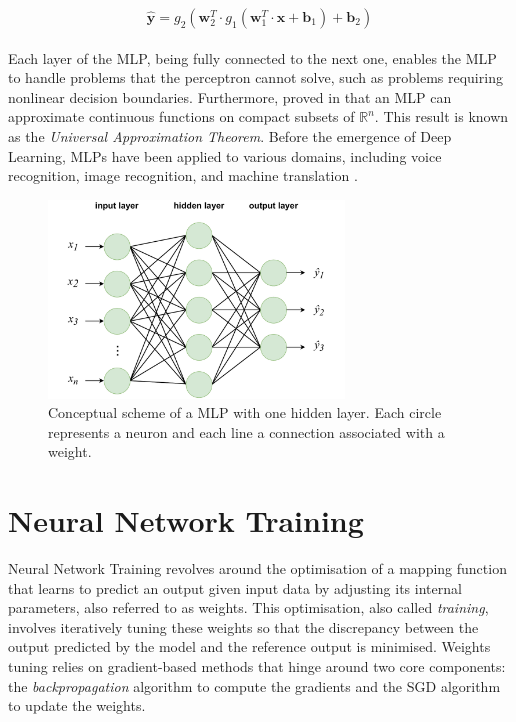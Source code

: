 \begin{equation}
  \label{eqn:dlo:mlp}
  \hat{\mathbf{y}} = g_2(\mathbf{w}_2^T \cdot  g_1(\mathbf{w}_1^T \cdot \mathbf{x} + \mathbf{b}_1) + \mathbf{b}_2)
\end{equation}\\

Each layer of the \ac{MLP}, being fully connected to the next one, enables the
\ac{MLP} to handle problems that the perceptron cannot solve, such as problems
requiring nonlinear decision boundaries. Furthermore,
\citeauthor{cybenko1989approximation} proved in \cite{cybenko1989approximation}
that an \ac{MLP} can approximate continuous functions on compact subsets of
$\mathds{R}^n$. This result is known as the \emph{Universal Approximation
Theorem}. Before the emergence of Deep Learning, \acp{MLP} have been applied to
various domains, including voice recognition, image recognition, and machine
translation \cite{wasserman1988neural}.


\begin{figure}[htbp]
  \centering
  \includegraphics[width=0.7\textwidth]{chapter_dlo/assets/mlp_scheme.pdf}
  \caption{Conceptual scheme of a \ac{MLP} with one hidden layer. Each circle
  represents a neuron and each line a connection associated with a weight.}
  \label{fig:dlo:mlp}
\end{figure}

\section{Neural Network Training}\label{sec:dlo:training}

Neural Network Training revolves around the optimisation of a mapping function
that learns to predict an output given input data by adjusting its internal
parameters, also referred to as weights. This optimisation, also called
\emph{training}, involves iteratively tuning these weights so that the
discrepancy between the output predicted by the model and the reference output
is minimised. Weights tuning relies on gradient-based methods that hinge
around two core components: the \emph{backpropagation} algorithm to compute the
gradients and the \ac{SGD} algorithm to update the weights.

